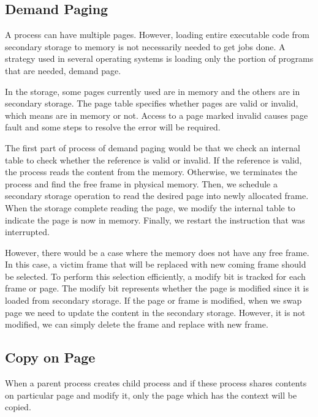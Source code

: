 \subsection{Demand Paging}
\label{sec:os_paging}
A process can have multiple pages. However, loading entire executable code from secondary storage to memory is not necessarily needed to 
get jobs done. A strategy used in several operating systems is loading only the portion of programs that are needed, demand page. 

In the storage, some pages currently used are in memory and the others are in secondary storage. 
The page table specifies whether pages are valid or invalid, which means are in memory or not. 
Access to a page marked invalid causes page fault and some steps to resolve the error will be required. 

The first part of process of demand paging would be that we check an internal table to check whether the reference is valid or invalid.
If the reference is valid, the process reads the content from the memory. Otherwise, we terminates the process and find the free frame in 
physical memory. Then, we schedule a secondary storage operation to read the desired page into newly allocated frame. 
When the storage complete reading the page, we modify the internal table to indicate the page is now in memory. 
Finally, we restart the instruction that was interrupted. 

However, there would be a case where the memory does not have any free frame. In this case, a victim frame that will be replaced with new coming frame should be selected. 
To perform this selection efficiently, a modify bit is tracked for each frame or page. The modify bit represents whether the page is modified since it is loaded from secondary storage. 
If the page or frame is modified, when we swap page we need to update the content in the secondary storage. However, it is not modified, we can simply delete the frame and replace with new frame.



\subsection{Copy on Page}
\label{sec:os_copypage}
When a parent process creates child process and if these process shares contents on particular page and modify it, 
only the page which has the context will be copied.


